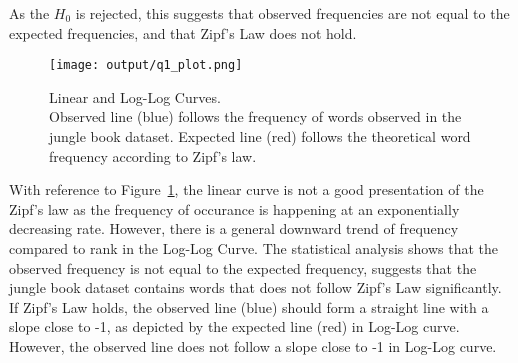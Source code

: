 As the $H_0$ is rejected, this suggests that observed frequencies are not equal to the expected frequencies, and that Zipf's Law does not hold.


\begin{figure}[h!]
    \centering
    \texttt{[image: output/q1\_plot.png]}
    \caption{
        Linear and Log-Log Curves.\\
        Observed line (blue) follows the frequency of words observed in the jungle book dataset.
        Expected line (red) follows the theoretical word frequency according to Zipf's law.
    }
    \label{fig:linear_log_curve}
\end{figure}

With reference to Figure~\ref{fig:linear_log_curve}, the linear curve is not a good presentation of the Zipf's law as the frequency of occurance is happening at an exponentially decreasing rate.
However, there is a general downward trend of frequency compared to rank in the Log-Log Curve.
The statistical analysis shows that the observed frequency is not equal to the expected frequency, suggests that the jungle book dataset contains words that does not follow Zipf's Law significantly.
If Zipf's Law holds, the observed line (blue) should form a straight line with a slope close to -1, as depicted by the expected line (red) in Log-Log curve. 
However, the observed line does not follow a slope close to -1 in Log-Log curve. 
